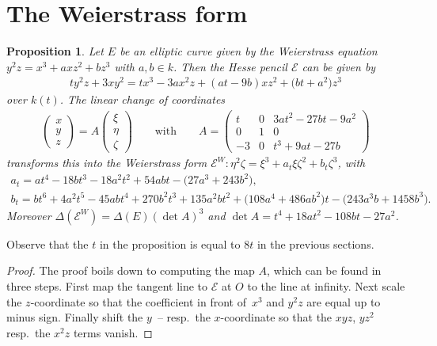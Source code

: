 \documentclass[pdftex]{sigma}
\newcommand{\msetp}[1]{{\left({#1}\right)}}					%
\numberwithin{equation}{section}
\newtheorem{Proposition}[Theorem]{Proposition}
\begin{document}
\section{The Weierstrass form}\label{hpga:sec:wf}

\begin{Proposition}\label{prop7}Let $E$ be an elliptic curve given by the Weierstrass equation $y^2z=x^3+axz^2+bz^3$ with $a,b\in k$. Then the Hesse pencil $\mathcal{E}$ can be given by
\begin{gather*}
ty^2z+3xy^2=tx^3-3ax^2z+\msetp{at-9b}xz^2+ \big(bt+a^2\big)z^3
\end{gather*}
over $k\msetp{t}$. The linear change of coordinates
\begin{gather*}
\begin{pmatrix}
x \\ y \\ z
\end{pmatrix}
=A\begin{pmatrix}
\xi \\ \eta \\ \zeta
\end{pmatrix}
\qquad\text{with}\qquad
A=\begin{pmatrix}
t & 0 & 3at^2-27bt-9a^2 \\
0 & 1 & 0 \\
-3 & 0 & t^3+9at-27b
\end{pmatrix}
\end{gather*}
transforms this into the Weierstrass form $\mathcal{E}^W\colon \eta^2\zeta=\xi^3+a_t \xi\zeta^2+b_t\zeta^3$, with
\begin{gather*}
a_t = at^4-18bt^3-18a^2t^2+54abt-\big(27a^3+243b^2\big), \\
b_t = bt^6+4a^2t^5-45abt^4+270b^2t^3+135a^2bt^2 +\big(108a^4+486ab^2\big)t-\big(243a^3b+1458b^3\big).
\end{gather*}
Moreover $\Delta\msetp{\mathcal{E}^W}=\Delta\msetp{E}\msetp{\det A}^3$ and $\det A=t^4+18at^2-108bt-27a^2$.
\end{Proposition}

Observe that the $t$ in the proposition is equal to $8t$ in the previous sections.

\begin{proof}The proof boils down to computing the map $A$, which can be found in three steps. First map the tangent line to $\mathcal{E}$ at $O$ to the line at infinity. Next scale the $z$-coordinate so that the coefficient in front of~$x^3$ and $y^2z$ are equal up to minus sign. Finally shift the $y$~-- resp.\ the $x$-coordinate so that the $xyz$, $yz^2$ resp.\ the $x^2z$ terms vanish.
\end{proof}
\end{document}
